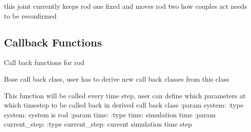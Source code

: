 \documentclass[letterpaper,10pt,english]{sphinxmanual}
\begin{document}
\begin{fulllineitems}
\label{\detokenize{documentation:elastica.joint.HingeJoint}}
this joint currently keeps rod one fixed and moves rod two
how couples act needs to be reconfirmed

\end{fulllineitems}



\subsection{Callback Functions}
\label{\detokenize{documentation:module-elastica.callback_functions}}\label{\detokenize{documentation:callback-functions}}
Call back functions for rod

\begin{fulllineitems}
\label{\detokenize{documentation:elastica.callback_functions.CallBackBaseClass}}
Base call back class, user has to derive new
call back classes from this class

\begin{fulllineitems}
\label{\detokenize{documentation:elastica.callback_functions.CallBackBaseClass.make_callback}}
This function will be called every time step, user can
define which parameters at which time\sphinxhyphen{}step to be called back
in derived call back class
:param system:
:type system: system is rod
:param time:
:type time: simulation time
:param current\_step:
:type current\_step: current simulation time step

\end{fulllineitems}


\end{fulllineitems}
\end{document}
